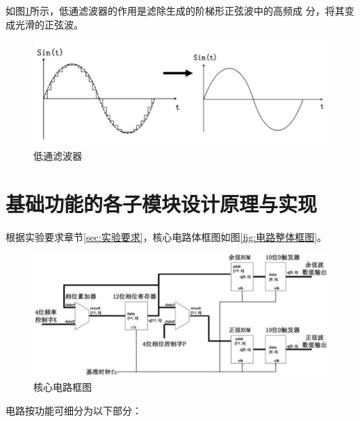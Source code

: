 \documentclass[twoside, openright]{article}
\begin{document}
如图\ref{fig:低通滤波器}所示，低通滤波器的作用是滤除生成的阶梯形正弦波中的高频成
分，将其变成光滑的正弦波。

\begin{figure}[htbp]
	\centering
	\includegraphics[width = 0.6\linewidth]{lowpass.png}
	\caption{低通滤波器}
	\label{fig:低通滤波器}
\end{figure}

\section{基础功能的各子模块设计原理与实现}%
\label{sec:基础功能的各子模块设计原理与实现}

根据实验要求章节\ref{sec:实验要求}，核心电路体框图如图\ref{fig:电路整体框图}。

\begin{figure}[htbp]
	\centering
	\includegraphics[width=0.6\linewidth]{block.png}
	\caption{核心电路框图}
	\label{fig:核心电路框图}
\end{figure}

电路按功能可细分为以下部分：
\end{document}
